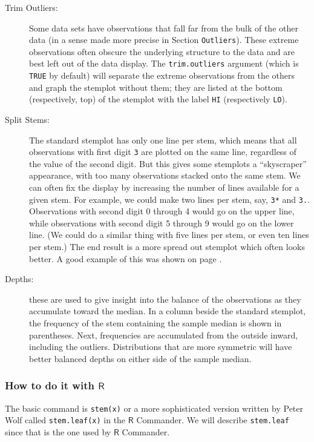 \documentclass[10pt,english]{scrbook}
\begin{document}
\begin{description}
\item[Trim Outliers:] Some data sets have observations that fall far from the bulk of the other data (in a sense made more precise in Section \texttt{Outliers}). These extreme observations often obscure the underlying structure to the data and are best left out of the data display. The \texttt{trim.outliers} argument (which is \texttt{TRUE} by default) will separate the extreme observations from the others and graph the stemplot without them; they are listed at the bottom (respectively, top) of the stemplot with the label \texttt{HI} (respectively \texttt{LO}).

\item[Split Stems:] The standard stemplot has only one line per stem, which means that all observations with first digit \texttt{3} are plotted on the same line, regardless of the value of the second digit. But this gives some stemplots a ``skyscraper'' appearance, with too many observations stacked onto the same stem. We can often fix the display by increasing the number of lines available for a given stem. For example, we could make two lines per stem, say, \texttt{3*} and \texttt{3.}. Observations with second digit 0 through 4 would go on the upper line, while observations with second digit 5 through 9 would go on the lower line. (We could do a similar thing with five lines per stem, or even ten lines per stem.) The end result is a more spread out stemplot which often looks better. A good example of this was shown on page \pageref{exa-stemleaf-multiple-lines-stem}.

\item[Depths:] these are used to give insight into the balance of the observations as they accumulate toward the median. In a column beside the standard stemplot, the frequency of the stem containing the sample median is shown in parentheses. Next, frequencies are accumulated from the outside inward, including the outliers. Distributions that are more symmetric will have better balanced depths on either side of the sample median.
\end{description}

\subsubsection[How to do it with \(\mathsf{R}\)]{How to do it with \(\mathsf{R}\)}
\label{sec-1-4-1-1}

The basic command is \texttt{stem(x)} or a more sophisticated version written by Peter Wolf called \texttt{stem.leaf(x)} in the \(\mathsf{R}\) Commander. We will describe \texttt{stem.leaf} since that is the one used by \(\mathsf{R}\) Commander.
\end{document}
